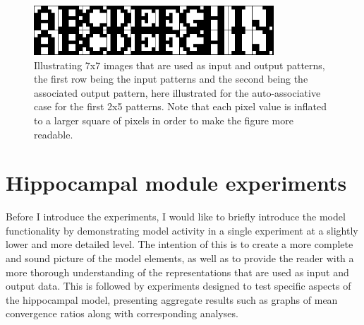 \begin{figure}\label{fig:sample_letters}
    \centering
    \includegraphics[width=9cm]{fig/im_both.png}
    \caption{Illustrating 7x7 images that are used as input and output patterns, the first row being the input patterns and the second being the associated output pattern, here illustrated for the auto-associative case for the first 2x5 patterns. Note that each pixel value is inflated to a larger square of pixels in order to make the figure more readable.}
\end{figure}


\section{Hippocampal module experiments}\label{section:hpc-experiments}

Before I introduce the experiments, I would like to briefly introduce the model functionality by demonstrating model activity in a single experiment at a slightly lower and more detailed level. The intention of this is to create a more complete and sound picture of the model elements, as well as to provide the reader with a more thorough understanding of the representations that are used as input and output data. 
This is followed by experiments designed to test specific aspects of the hippocampal model, presenting aggregate results such as graphs of mean convergence ratios along with corresponding analyses.

